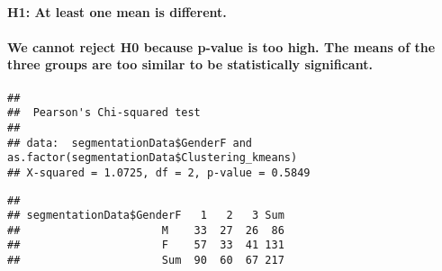 \documentclass[
]{article}
\newenvironment{Shaded}{\begin{snugshade}}{\end{snugshade}}
\newcommand{\DecValTok}[1]{\textcolor[rgb]{0.00,0.00,0.81}{#1}}
\newcommand{\FunctionTok}[1]{\textcolor[rgb]{0.00,0.00,0.00}{#1}}
\newcommand{\NormalTok}[1]{#1}
\newcommand{\OtherTok}[1]{\textcolor[rgb]{0.56,0.35,0.01}{#1}}
\newcommand{\SpecialCharTok}[1]{\textcolor[rgb]{0.00,0.00,0.00}{#1}}
\begin{document}
\hypertarget{h1-at-least-one-mean-is-different.-1}{%
\paragraph{H1: At least one mean is
different.}\label{h1-at-least-one-mean-is-different.-1}}

\hypertarget{we-cannot-reject-h0-because-p-value-is-too-high.-the-means-of-the-three-groups-are-too-similar-to-be-statistically-significant.-1}{%
\paragraph{We cannot reject H0 because p-value is too high. The means of
the three groups are too similar to be statistically
significant.}\label{we-cannot-reject-h0-because-p-value-is-too-high.-the-means-of-the-three-groups-are-too-similar-to-be-statistically-significant.-1}}

\begin{Shaded}
\end{Shaded}

\begin{verbatim}
## 
##  Pearson's Chi-squared test
## 
## data:  segmentationData$GenderF and as.factor(segmentationData$Clustering_kmeans)
## X-squared = 1.0725, df = 2, p-value = 0.5849
\end{verbatim}

\begin{Shaded}
\end{Shaded}

\begin{verbatim}
##                         
## segmentationData$GenderF   1   2   3 Sum
##                      M    33  27  26  86
##                      F    57  33  41 131
##                      Sum  90  60  67 217
\end{verbatim}

\begin{Shaded}
\end{Shaded}
\end{document}
